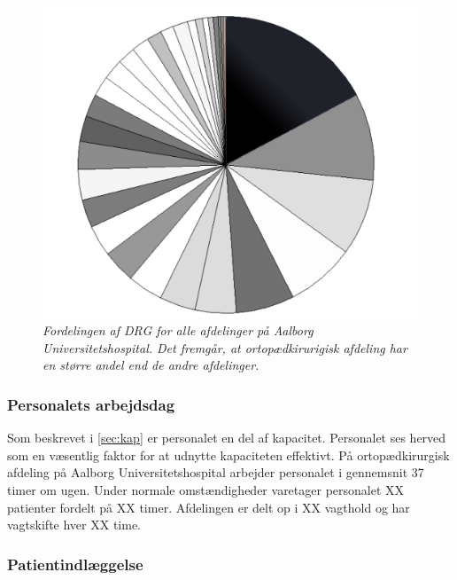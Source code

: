 \begin{figure}[H]
	\flushleft 
	\centering
	\includegraphics[scale=0.45]{figures/Ortopaeddiagram.png}
	\flushleft
	\caption{\textit{Fordelingen af DRG for alle afdelinger på Aalborg Universitetshospital. Det fremgår, at ortopædkirurigisk afdeling har en større andel end de andre afdelinger.}\cite{Rasmussen2016}}
	\label{DRG_budget}
\end{figure}


\subsubsection{Personalets arbejdsdag} 
Som beskrevet i \autoref{sec:kap} er personalet en del af kapacitet. Personalet ses herved som en væsentlig faktor for at  udnytte kapaciteten effektivt. På ortopædkirurgisk afdeling på Aalborg Universitetshospital arbejder personalet i gennemsnit 37 timer om ugen\cite{Danske2015}. Under normale omstændigheder varetager personalet XX patienter fordelt på XX timer. Afdelingen er delt op i XX vagthold og har vagtskifte hver XX time. 

\subsubsection{Patientindlæggelse}


